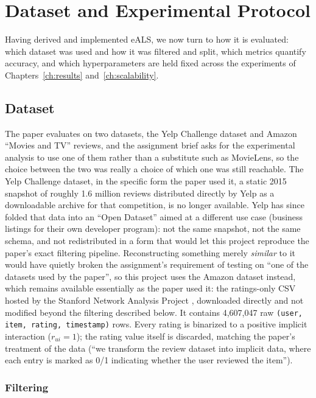 \chapter{Dataset and Experimental Protocol}
\label{ch:protocol}

Having derived and implemented eALS, we now turn to how it is evaluated:
which dataset was used and how it was filtered and split, which metrics
quantify accuracy, and which hyperparameters are held fixed across the
experiments of Chapters~\ref{ch:results} and~\ref{ch:scalability}.

\section{Dataset}

The paper evaluates on two datasets, the Yelp Challenge dataset and Amazon
``Movies and TV'' reviews, and the assignment brief asks for the
experimental analysis to use one of them rather than a substitute such as
MovieLens, so the choice between the two was really a choice of which one
was still reachable. The Yelp Challenge dataset, in the specific form the
paper used it, a static 2015 snapshot of roughly 1.6 million reviews
distributed directly by Yelp as a downloadable archive for that
competition, is no longer available. Yelp has since folded that data into
an ``Open Dataset'' aimed at a different use case (business listings for
their own developer program): not the same snapshot, not the same schema,
and not redistributed in a form that would let this project reproduce the
paper's exact filtering pipeline. Reconstructing something merely
\emph{similar} to it would have quietly broken the assignment's requirement
of testing on ``one of the datasets used by the paper'', so this project
uses the Amazon dataset instead, which remains available essentially as
the paper used it: the ratings-only CSV hosted by the Stanford Network
Analysis Project \citep{amazonreviews}, downloaded directly and not
modified beyond the filtering described below. It contains
4{,}607{,}047 raw \texttt{(user, item, rating, timestamp)} rows. Every
rating is binarized to a positive implicit interaction ($r_{ui}=1$); the
rating value itself is discarded, matching the paper's treatment of the
data (``we transform the review dataset into implicit data, where each
entry is marked as 0/1 indicating whether the user reviewed the item'').

\subsection{Filtering}

